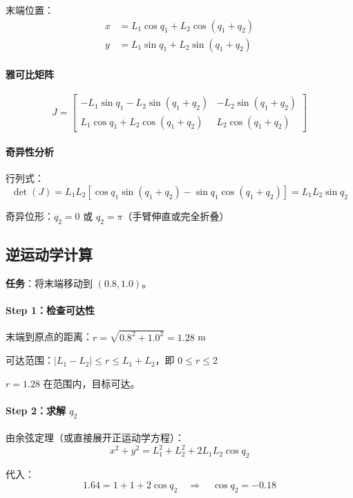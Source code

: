 末端位置：
\begin{align}
x &= L_1 \cos q_1 + L_2 \cos(q_1 + q_2) \\
y &= L_1 \sin q_1 + L_2 \sin(q_1 + q_2)
\end{align}

\paragraph{雅可比矩阵}

\begin{equation}
J = \begin{bmatrix}
-L_1 \sin q_1 - L_2 \sin(q_1+q_2) & -L_2 \sin(q_1+q_2) \\
L_1 \cos q_1 + L_2 \cos(q_1+q_2) & L_2 \cos(q_1+q_2)
\end{bmatrix}
\end{equation}

\paragraph{奇异性分析}

行列式：
\[
\det(J) = L_1 L_2 [\cos q_1 \sin(q_1+q_2) - \sin q_1 \cos(q_1+q_2)] = L_1 L_2 \sin q_2
\]

奇异位形：$q_2 = 0$ 或 $q_2 = \pi$（手臂伸直或完全折叠）

\subsection{逆运动学计算}

\textbf{任务}：将末端移动到 $(0.8, 1.0)$。

\paragraph{Step 1：检查可达性}

末端到原点的距离：$r = \sqrt{0.8^2 + 1.0^2} = 1.28$ m

可达范围：$|L_1 - L_2| \leq r \leq L_1 + L_2$，即 $0 \leq r \leq 2$

$r = 1.28$ 在范围内，目标可达。

\paragraph{Step 2：求解 $q_2$}

由余弦定理（或直接展开正运动学方程）：
\[
x^2 + y^2 = L_1^2 + L_2^2 + 2L_1 L_2 \cos q_2
\]

代入：
\[
1.64 = 1 + 1 + 2 \cos q_2 \quad \Rightarrow \quad \cos q_2 = -0.18
\]

